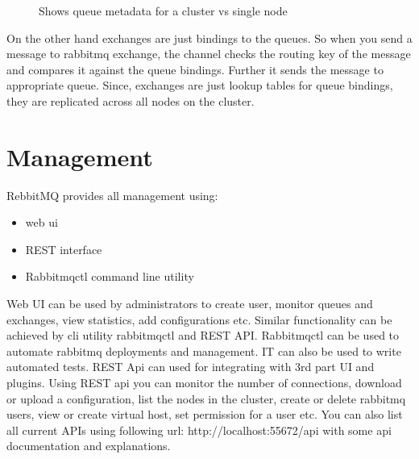 \documentclass[9pt,twocolumn,twoside]{styles/osajnl}
\begin{document}
\begin{figure}[htbp]
\centering
{}
\caption{Shows queue metadata for a cluster vs single node}\cite{videla2012rabbitmq}
\label{fig:false-color}
\end{figure}

On the other hand exchanges are just bindings to the queues. So when you send a message to rabbitmq exchange, the channel checks the routing key of the message and compares it against the queue bindings. Further it sends the message to appropriate queue. Since, exchanges are just lookup tables for queue bindings, they are replicated across all nodes on the cluster. 

\section{Management}
RebbitMQ provides all management using:
\begin{itemize}
	\item  web ui 
	\item REST interface
	\item Rabbitmqctl command line utility
\end{itemize}

Web UI can be used by administrators to create user, monitor queues and exchanges, view statistics, add configurations etc. Similar functionality can be achieved by cli utility rabbitmqctl and REST API. Rabbitmqctl can be used to automate rabbitmq deployments and management. IT can also be used to write automated tests. REST Api can used for integrating with 3rd part UI and plugins. Using REST api you can monitor the number of connections, download or upload a configuration, list the nodes in the cluster, create or delete rabbitmq users, view or create virtual host, set permission for a user etc. You can also list all current APIs using following url: http://localhost:55672/api with some api documentation and explanations.
\end{document}
